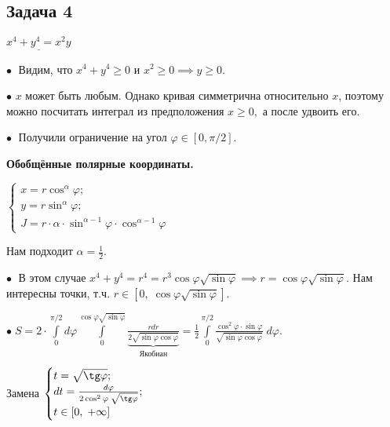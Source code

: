 \documentclass[a4paper, fleqn]{article}
\begin{document}
    
    \subsection*{Задача 4}
    
    $\underline{x^4 + y^4 = x^2 y}$
    
    $\bullet \; $ Видим, что $x^4 + y^4 \geq 0$ и $x^2 \geq 0 \implies y \geq 0.$
    
    $\bullet$ $x$ может быть любым. Однако кривая симметрична относительно $x$, поэтому можно посчитать интеграл из предположения $x \geq 0,$ а после удвоить его.
    
    $\bullet \; $ Получили ограничение на угол $\varphi \in [0, \pi/2].$
    
    \textbf{Обобщённые полярные координаты.}
    
    $\begin{cases}
    x = r \cos^{\alpha} \varphi;\\
    y = r \sin^{\alpha} \varphi;\\
    J = r \cdot \alpha \cdot  \sin^{\alpha - 1} \varphi \cdot \cos^{\alpha - 1} \varphi
    \end{cases}$
    
    Нам подходит $\alpha = \frac{1}{2}.$
    
    $\bullet \; $ В этом случае $x^4 + y^4 = r^4 = r^3 \cos \varphi \sqrt{\sin \varphi} \implies r = \cos \varphi \sqrt{\sin \varphi}.$ Нам интересны точки, т.ч. $r \in [0, \; \cos \varphi \sqrt{\sin \varphi}].$
    
    $\bullet \; S = 2 \cdot \int\limits_{0}^{\pi/2} d \varphi \int\limits_{0}^{\cos \varphi \sqrt{\sin \varphi}} \underbrace{\frac{r dr}{2 \sqrt{\sin \varphi \cos \varphi}}}_{\text{Якобиан}} = \frac{1}{2} \int\limits_{0}^{\pi/2} \frac{\cos^2 \varphi \cdot \sin \varphi}{\sqrt{\sin \varphi \cos \varphi}} \; d \varphi.$
    
    Замена $\begin{cases}
    t = \sqrt{\tg \varphi}; \\
    dt = \frac{d \varphi}{2 \cos^2 \varphi \; \sqrt{\tg \varphi}};\\
    t \in [0, \; +\infty]
    \end{cases}$
    
\end{document}
